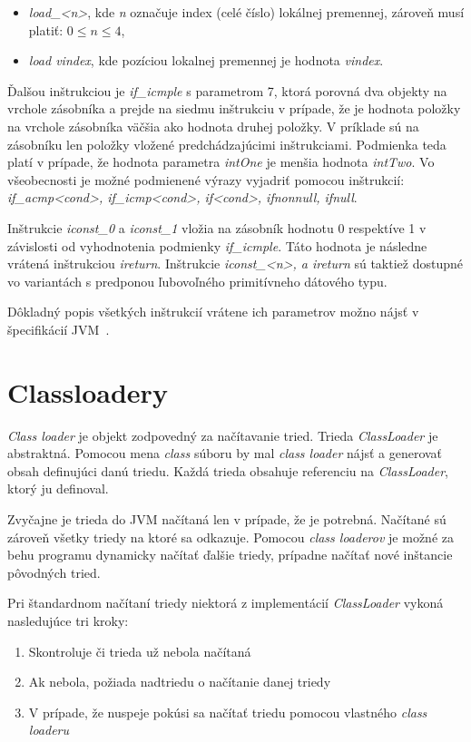 \documentclass[11pt,final,oneside]{fithesis}
\begin{document}
\begin{itemize}
\item \textit{load\_<n>}, kde \textit{n} označuje index (celé číslo) lokálnej 
premennej, zároveň musí platiť: $0 \leq n \leq 4$,
\item \textit{load vindex}, kde pozíciou lokalnej premennej je hodnota
\textit{vindex}.
\end{itemize}

Ďalšou inštrukciou je \textit{if\_icmple} s parametrom 7, ktorá porovná dva 
objekty na vrchole zásobníka a prejde na siedmu inštrukciu v prípade, že je 
hodnota položky na vrchole zásobníka väčšia ako hodnota druhej položky. V 
príklade sú na zásobníku len položky vložené predchádzajúcimi inštrukciami.
Podmienka teda platí v prípade, že hodnota parametra \textit{intOne} je menšia 
hodnota \textit{intTwo}. Vo všeobecnosti je možné podmienené výrazy vyjadriť 
pomocou inštrukcií: \textit{if\_acmp<cond>, if\_icmp<cond>, if<cond>, 
ifnonnull, ifnull}.

Inštrukcie \textit{iconst\_0} a \textit{iconst\_1} vložia na zásobník hodnotu 0
respektíve 1 v závislosti od vyhodnotenia podmienky \textit{if\_icmple}. Táto 
hodnota je následne vrátená inštrukciou \textit{ireturn}. Inštrukcie
\textit{iconst\_<n>, a ireturn} sú taktiež dostupné vo variantách s predponou 
ľubovoľného primitívneho dátového typu.

Dôkladný popis všetkých inštrukcií vrátene ich parametrov možno nájsť v 
špecifikácií JVM~\cite{Lindholm:2013:JVM:2462629}.

\chapter{Classloadery} 
\textit{Class loader} je objekt zodpovedný za načítavanie tried. Trieda
\textit{ClassLoader} je abstraktná. Pomocou mena \textit{class} súboru by mal
\textit{class loader} nájsť a generovať obsah definujúci danú triedu. Každá
trieda obsahuje referenciu na \textit{ClassLoader}, ktorý ju
definoval.~\cite{Oracle:ClassLoader}

Zvyčajne je trieda do JVM načítaná len v prípade, že je potrebná. Načítané sú 
zároveň všetky triedy na ktoré sa odkazuje. Pomocou \textit{class loaderov} je
možné za behu programu dynamicky načítať ďalšie triedy, prípadne načítať nové 
inštancie pôvodných tried.

Pri štandardnom načítaní triedy niektorá z implementácií \textit{ClassLoader} 
vykoná nasledujúce tri kroky:
\begin{enumerate}
\item Skontroluje či trieda už nebola načítaná
\item Ak nebola, požiada nadtriedu o načítanie danej triedy 
\item V prípade, že nuspeje pokúsi sa načítať triedu pomocou
vlastného \textit{class loaderu}
\end{enumerate}
\end{document}
